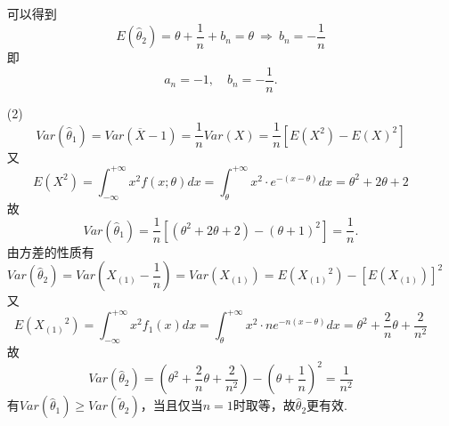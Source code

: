 \documentclass{article}
\begin{document}
\begin{enumerate}
\[    \]
    可以得到
    \[
        E(\widehat{\theta}_2)
        = \theta + \frac{1}{n} + b_n    
        = \theta
        \ \Rightarrow\ 
        b_n = - \frac{1}{n}
    \]
    即
    \[
        a_n = -1,\quad 
        b_n = -\frac{1}{n}.    
    \]
    \item [(2)]
    \[
        Var(\widehat{\theta}_1)
        = Var\left(\overline{X}-1\right)
        = \frac{1}{n} Var(X)
        = \frac{1}{n} {\left[ E(X^2) - {E(X)}^2 \right]}     
    \]
    又
    \[
        E(X^2)    
        = \int_{-\infty}^{+\infty} x^2 f(x;\theta) dx
        = \int_{\theta}^{+\infty} x^2 \cdot e^{-(x-\theta)} dx
        = \theta^2 + 2\theta + 2
    \]
    故
    \[
        Var(\widehat{\theta}_1)
        = \frac{1}{n}\left[(\theta^2 + 2\theta + 2) - {(\theta + 1)}^2 \right]   
        = \frac{1}{n} .
    \]
    由方差的性质有
    \[
        Var(\widehat{\theta}_2)
        = Var\left(X_{(1)} - \frac{1}{n} \right)
        = Var\left(X_{(1)}\right)
        = E\left({X_{(1)}}^2 \right) - {\left[E\left(X_{(1)}\right) \right]}^2
    \]
    又
    \[
        E\left({X_{(1)}}^2 \right)
        = \int_{-\infty}^{+\infty} x^2 f_{1} (x) dx
        = \int_{\theta}^{+\infty} x^2 \cdot n e^{-n(x-\theta)} dx
        = \theta^2 + \frac{2}{n} \theta + \frac{2}{n^2}
    \]
    故
    \[
        Var(\widehat{\theta}_2)
        = \left(\theta^2 + \frac{2}{n} \theta + \frac{2}{n^2} \right)  - {\left(\theta + \frac{1}{n}\right)}^2
        = \frac{1}{n^2}
    \]
    有$Var(\widehat{\theta}_1) \geq Var(\widetilde{\theta}_2)$，当且仅当$n = 1$时取等，故$\widehat{\theta}_2$更有效.
\end{enumerate}
\end{document}
